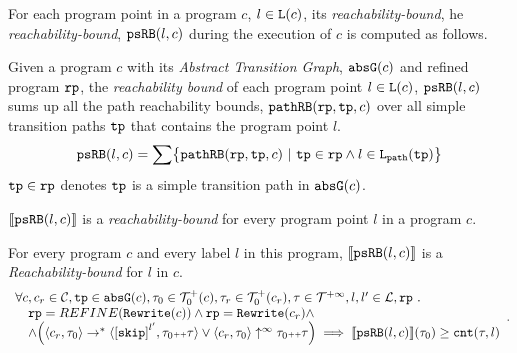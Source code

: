 For each program point in a program $c$, $l \in \mathtt{L}(c)$,
its \emph{reachability-bound}, he \emph{reachability-bound}, $\mathtt{psRB}(l, c)$ during the execution of $c$ is computed as follows.
%
\begin{defn}
\label{def:point_psrb}
Given a program $c$ with its \emph{Abstract Transition Graph}, $\mathtt{abs}{\mathtt{G}}(c)$ and refined program $\mathtt{rp}$,
the \emph{reachability bound} of each program point $l \in \mathtt{L}(c)$, $\mathtt{psRB}(l, c)$ 
sums up all the path reachability bounds, $\mathtt{pathRB}(\mathtt{rp}, \mathtt{tp}, c)$ over all simple transition paths $\mathtt{tp}$ that contains the program point $l$.
\[ 
  \psRB(l, c) = 
  \sum
  \left\{ \inoutB(\rprog, \tpath, c) ~\vert~ \tpath \in \rprog \land 
  l \in \pathl(\tpath) \right\}
\]
$\mathtt{tp} \in \mathtt{rp}$ denotes $\mathtt{tp}$ is a simple transition path in $\mathtt{abs}{\mathtt{G}}(c)$.
\end{defn}
$\llbracket \mathtt{psRB}(l, c) \rrbracket$ is a \emph{reachability-bound} for every program point $l$ in a program $c$.
\begin{thm}[Soundness]
\label{thm:pathsensitive_rb_soundness}
For every program ${c}$ and every label $l$ in this program,
$\llbracket \mathtt{psRB}(l, c) \rrbracket$ is a \emph{Reachability-bound} for $l$ in $c$.
%
{\small
\[
  \begin{array}{l}
    \forall c, c_r \in \cdom, \tpath \in \absG(c), \trace_0 \in \ftdom_0(c),  \trace_r \in \ftdom_0(c_r), \trace \in \tdom, l, l' \in \ldom, \rprog \st 
    \\ \quad
    \rprog = REFINE(\algrewrite(c))
    \land 
    \rprog = \algrewrite(c_r)
    \land
    \\ \quad
    \land
    \Big(
    \config{c_r, \trace_0} \rightarrow^* \config{\clabel{\eskip}^{l'}, \trace_0 \tracecat \trace}
    \lor \config{c_r, \trace_0} \uparrow^{\infty} \trace_0 \tracecat \trace 
    \Big)
    \implies \econfig{\psRB(l, c)}(\trace_0) \geq \counter(\trace, l)
  \end{array}.
\]
}
\end{thm}